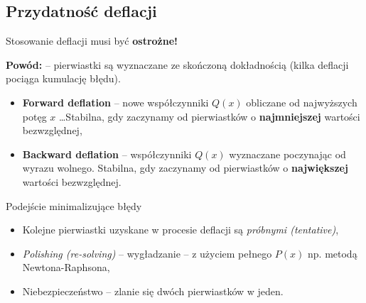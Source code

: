\subsection{Przydatność deflacji}

\begin{frame}
  Stosowanie deflacji musi być \textbf{ostrożne!}

  \textbf{Powód:} -- pierwiastki są wyznaczane ze skończoną dokładnością (kilka deflacji pociąga kumulację błędu).

  \begin{block}{}
    \begin{itemize}
      \item \textbf{Forward deflation} -- nowe współczynniki $Q(x)$ obliczane od najwyższych potęg $x$ \dots Stabilna, gdy zaczynamy od pierwiastków o \textbf{najmniejszej} wartości bezwzględnej,
      \item \textbf{Backward deflation} -- współczynniki $Q(x)$ wyznaczane poczynając od wyrazu wolnego.  Stabilna, gdy zaczynamy od pierwiastków o \textbf{największej} wartości bezwzględnej.
    \end{itemize}
  \end{block}

\end{frame}

\begin{frame}
  \begin{block}{Podejście minimalizujące błędy}
    \begin{itemize}
      \item Kolejne pierwiastki uzyskane w procesie deflacji są \textit{próbnymi (tentative)},
      \item \textit{Polishing (re-solving)} -- wygładzanie -- z użyciem pełnego $P(x)$ np. metodą Newtona-Raphsona,
      \item Niebezpieczeństwo -- zlanie się dwóch pierwiastków w jeden.\\
    \end{itemize}
  \end{block}
\end{frame}
